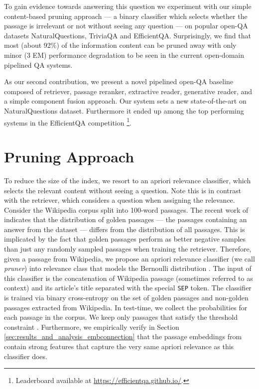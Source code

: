 \documentclass[11pt,a4paper]{article}
\begin{document}
To gain evidence towards answering this question we experiment with our simple content-based pruning approach --- a binary classifier which selects whether the passage is irrelevant or not without seeing any question ---  on popular open-QA datasets NaturalQuestions, TriviaQA and EfficientQA. Surprisingly, we find that most (about 92\%) of the information content can be pruned away with only minor (3 EM) performance degradation to be seen in the current open-domain pipelined QA systems.


As our second contribution, we present a novel pipelined open-QA baseline composed of retriever, passage reranker, extractive reader, generative reader, and a simple component fusion approach.
Our system sets a new state-of-the-art on NaturalQuestions dataset. Furthermore it ended up among the top performing systems in the EfficientQA competition \cite{min2021neurips}\footnote{Leaderboard available at \url{https://efficientqa.github.io/}.}.

\section{Pruning Approach}
To reduce the size of the index, we resort to an apriori relevance classifier, which selects the relevant content without seeing a question. Note this is in contrast with the retriever, which considers a question when assigning the relevance. Consider the Wikipedia corpus split into 100-word passages. 
The recent work of \citet{karpukhin2020dense} indicates that the distribution of golden passages --- the passages containing an answer from the dataset --- differs from the distribution of all passages. 
This is implicated by the fact that golden passages perform as better negative samples than just any randomly sampled passages when training the retriever.
Therefore, given a passage  from Wikipedia, we propose an apriori relevance classifier (we call \emph{pruner}) into relevance class  that models the Bernoulli distribution . 
The input of this classifier is the concatenation of Wikipedia passage (sometimes referred to as context) and its article's title separated with the special \texttt{SEP} token.
The classifier is trained via binary cross-entropy on the set of golden passages and non-golden passages extracted from Wikipedia.
In test-time, we collect the probabilities  for each passage  in the corpus. 
We keep only passages  that satisfy the threshold constraint . 
Furthermore, we empirically verify in Section \ref{sec:results_and_analysis_embconnection} that the passage embeddings from \citet{karpukhin2020dense} contain strong features that capture the very same apriori relevance as this classifier does.
\end{document}
